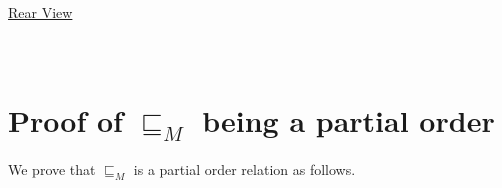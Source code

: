 \documentclass[final,3p, review, times]{Elsevier/elsarticle}
\begin{document}
\\\\\\\\\\\\\\\\\\\\\\\\\\\\\\
\centerline{\underline{\Large{Rear View}}}








\section{\\Proof of $\sqsubseteq_M$ being a partial order}
\label{app:interval_partial}

We prove that $\sqsubseteq_M$ is a partial order relation as follows.
\end{document}
